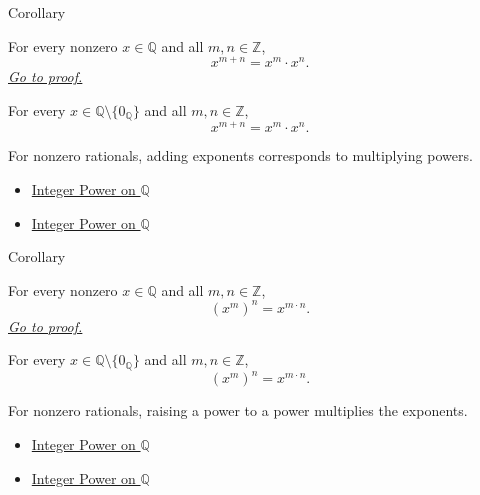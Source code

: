 \begin{corollarybox}{Corollary}
\begin{corollary}
\label{cor:exponent-addition-on-q}
For every nonzero $x\in\mathbb{Q}$ and all $m,n\in\mathbb{Z}$,
\[
x^{m+n}=x^m\cdot x^n.
\]
\hyperref[prf:exponent-addition-on-q]{\textit{Go to proof.}}
\end{corollary}
\end{corollarybox}

\begin{remark*}
For every $x\in\mathbb{Q}\setminus\{0_{\mathbb{Q}}\}$ and all
$m,n\in\mathbb{Z}$,
\[
x^{m+n}=x^m\cdot x^n.
\]
\end{remark*}

\begin{remark*}[Interpretation]
For nonzero rationals, adding exponents corresponds to multiplying powers.
\end{remark*}

\begin{dependencies}
\begin{itemize}
  \item \hyperref[def:integer-power-on-q]{Integer Power on $\mathbb{Q}$}
  \item \hyperref[def:integer-power-on-q]{Integer Power on $\mathbb{Q}$}
\end{itemize}
\end{dependencies}

\begin{corollarybox}{Corollary}
\begin{corollary}
\label{cor:power-of-power-on-q}
For every nonzero $x\in\mathbb{Q}$ 
and all $m,n\in\mathbb{Z}$,
\[
(x^m)^n=x^{m\cdot n}.
\]
\hyperref[prf:power-of-power-on-q]{\textit{Go to proof.}}
\end{corollary}
\end{corollarybox}

\begin{remark*}
For every $x\in\mathbb{Q}\setminus\{0_{\mathbb{Q}}\}$ and all
$m,n\in\mathbb{Z}$,
\[
(x^m)^n=x^{m\cdot n}.
\]
\end{remark*}

\begin{remark*}[Interpretation]
For nonzero rationals, raising a power to a power multiplies the exponents.
\end{remark*}

\begin{dependencies}
\begin{itemize}
  \item \hyperref[def:integer-power-on-q]{Integer Power on $\mathbb{Q}$}
  \item \hyperref[def:integer-power-on-q]{Integer Power on $\mathbb{Q}$}
\end{itemize}
\end{dependencies}

